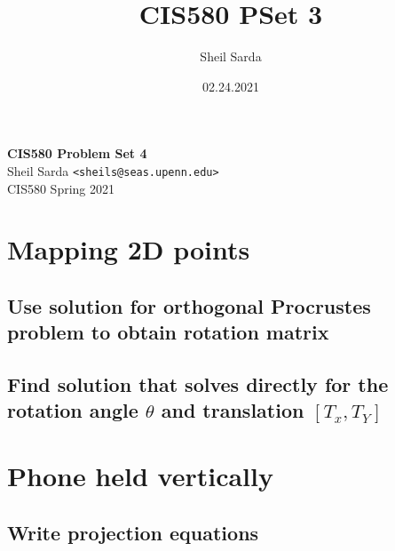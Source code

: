 \documentclass[12pt, oneside]{article}
\title{CIS580 PSet 3}
\author{Sheil Sarda}
\date{02.24.2021}
\begin{document}

\begin{titlepage}
    \begin{flushleft}
        \vspace*{1cm}
        \Huge
        \textbf{CIS580 Problem Set 4\\ }
        \vspace*{0.5cm}
        \normalsize
        Sheil Sarda \verb|<sheils@seas.upenn.edu>| \\
        CIS580 Spring 2021
        \tableofcontents
    \end{flushleft}
\end{titlepage}

\section{Mapping 2D points}

\subsection{Use solution for orthogonal Procrustes problem to obtain rotation 
matrix}

\subsection{Find solution that solves directly for the rotation angle $\theta$
and translation $[T_x, T_Y]$}

\section{Phone held vertically}

\subsection{Write projection equations}
\end{document}

